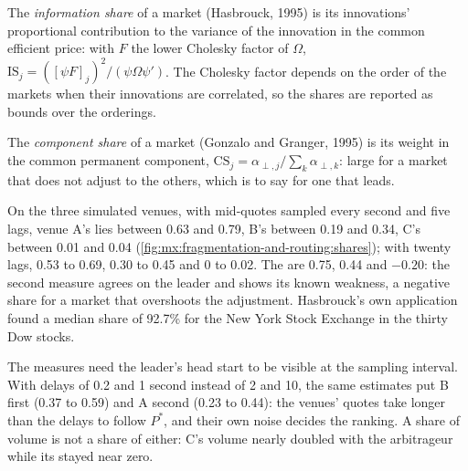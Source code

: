 \begin{definition}\label{def:mx:fragmentation-and-routing:is}
The \emph{information share} of a market (Hasbrouck, 1995) is its innovations' proportional contribution to the variance of the
innovation in the common efficient price: with $F$ the lower Cholesky factor of $\Omega$, $\mathrm{IS}_j=([\psi F]_j)^2/(\psi\Omega\psi')$. The
Cholesky factor depends on the order of the markets when their innovations are correlated, so the shares are reported as bounds over the orderings.
\end{definition}

\begin{definition}\label{def:mx:fragmentation-and-routing:cs}
The \emph{component share} of a market (Gonzalo and Granger, 1995) is its weight in the common permanent component,
$\mathrm{CS}_j=\alpha_{\perp,j}/\sum_k\alpha_{\perp,k}$: large for a market that does not adjust to the others, which is to say for one that leads.
\end{definition}

\label{lst:mx:fragmentation-and-routing:is}

On the three simulated venues, with mid-quotes sampled every second and five lags, venue A's  lies between 0.63 and 0.79, B's between
0.19 and 0.34, C's between 0.01 and 0.04 (\cref{fig:mx:fragmentation-and-routing:shares}); with twenty lags, 0.53 to 0.69, 0.30 to 0.45 and 0 to 0.02. The
 are 0.75, 0.44 and $-0.20$: the second measure agrees on the leader and shows its known weakness, a negative share for a market that
overshoots the adjustment. Hasbrouck's own application found a median share of 92.7\% for the New York Stock Exchange in the thirty Dow stocks.

The measures need the leader's head start to be visible at the sampling interval. With delays of 0.2 and 1 second instead of 2 and 10, the same
estimates put B first (0.37 to 0.59) and A second (0.23 to 0.44): the venues' quotes take longer than the delays to follow $P^\ast$, and their own
noise decides the ranking. A share of volume is not a share of  either: C's volume nearly doubled with the arbitrageur while its
 stayed near zero.

